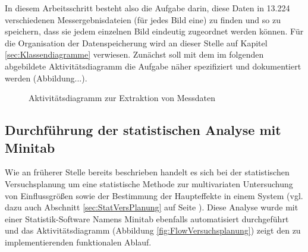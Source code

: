 \documentclass[
fontsize=10pt, 
listof = totoc,
parskip = half	
]{report}
\begin{document}
In diesem Arbeitsschritt besteht also die Aufgabe darin, diese Daten in 13.224 verschiedenen Messergebnisdateien (für jedes Bild eine) zu finden und so zu speichern, dass sie jedem einzelnen Bild eindeutig zugeordnet werden können. Für die Organisation der Datenspeicherung wird an dieser Stelle auf Kapitel \ref{sec:Klassendiagramme} verwiesen. Zunächst soll mit dem im folgenden abgebildete Aktivitätsdiagramm die Aufgabe näher spezifiziert und dokumentiert werden (Abbildung...).

\begin{figure}[H]
	\centering
	\caption{Aktivitätsdiagramm zur Extraktion von Messdaten}
	\label{fig:FlowDatenextraktion}
\end{figure}

\subsection{Durchführung der statistischen Analyse mit Minitab}
\label{subsec:FlowDoeMinitab}
Wie an früherer Stelle bereits beschrieben handelt es sich bei der statistischen Versuchsplanung um eine statistische Methode zur multivariaten Untersuchung von Einflussgrößen sowie der Bestimmung der Haupteffekte in einem System (vgl. dazu auch Abschnitt \ref{sec:StatVersPlanung} auf Seite \pageref{sec:StatVersPlanung}). Diese Analyse wurde mit einer Statistik-Software Namens Minitab ebenfalls automatisiert durchgeführt und das Aktivitätsdiagramm (Abbildung \ref{fig:FlowVersuchsplanung}) zeigt den zu implementierenden funktionalen Ablauf.
\end{document}
